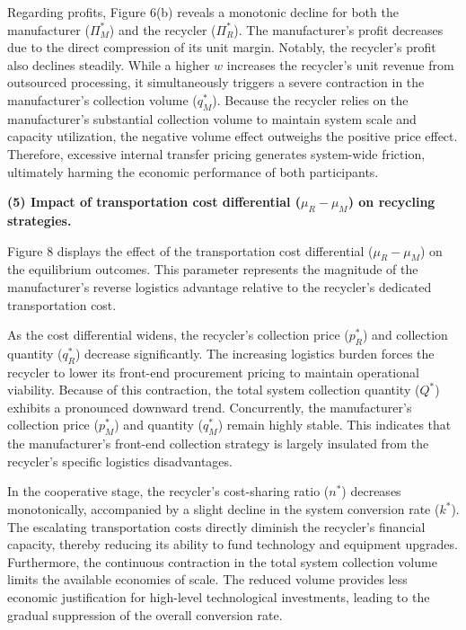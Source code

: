 \documentclass[authoryear,preprint,review,times,10pt]{elsarticle}
\begin{document}
Regarding profits, Figure 6(b) reveals a monotonic decline for both the manufacturer ($\Pi_M^*$) and the recycler ($\Pi_R^*$). The manufacturer's profit decreases due to the direct compression of its unit margin. Notably, the recycler's profit also declines steadily. While a higher $w$ increases the recycler's unit revenue from outsourced processing, it simultaneously triggers a severe contraction in the manufacturer's collection volume ($q_M^*$). Because the recycler relies on the manufacturer's substantial collection volume to maintain system scale and capacity utilization, the negative volume effect outweighs the positive price effect. Therefore, excessive internal transfer pricing generates system-wide friction, ultimately harming the economic performance of both participants.

\noindent\textbf{(5) Impact of transportation cost differential ($\mu_R - \mu_M$) on recycling strategies.}

Figure 8 displays the effect of the transportation cost differential ($\mu_R - \mu_M$) on the equilibrium outcomes. This parameter represents the magnitude of the manufacturer's reverse logistics advantage relative to the recycler's dedicated transportation cost.

As the cost differential widens, the recycler's collection price ($p_R^*$) and collection quantity ($q_R^*$) decrease significantly. The increasing logistics burden forces the recycler to lower its front-end procurement pricing to maintain operational viability. Because of this contraction, the total system collection quantity ($Q^*$) exhibits a pronounced downward trend. Concurrently, the manufacturer's collection price ($p_M^*$) and quantity ($q_M^*$) remain highly stable. This indicates that the manufacturer's front-end collection strategy is largely insulated from the recycler's specific logistics disadvantages.

In the cooperative stage, the recycler's cost-sharing ratio ($n^*$) decreases monotonically, accompanied by a slight decline in the system conversion rate ($k^*$). The escalating transportation costs directly diminish the recycler's financial capacity, thereby reducing its ability to fund technology and equipment upgrades. Furthermore, the continuous contraction in the total system collection volume limits the available economies of scale. The reduced volume provides less economic justification for high-level technological investments, leading to the gradual suppression of the overall conversion rate.
\end{document}
